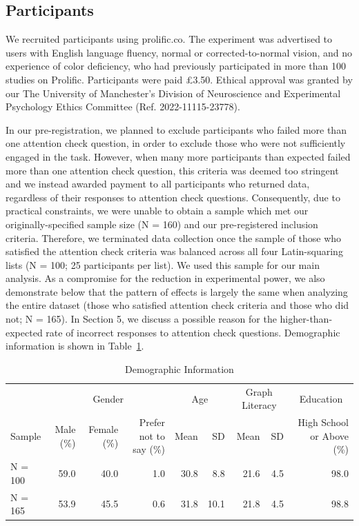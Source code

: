 \documentclass[
]{interact}
\begin{document}
\hypertarget{participants}{%
\subsection{Participants}\label{participants}}

We recruited participants using prolific.co. The experiment was
advertised to users with English language fluency, normal or
corrected-to-normal vision, and no experience of color deficiency, who
had previously participated in more than 100 studies on Prolific.
Participants were paid £3.50. Ethical approval was granted by our The
University of Manchester's Division of Neuroscience and Experimental
Psychology Ethics Committee (Ref. 2022-11115-23778).

In our pre-registration, we planned to exclude participants who failed
more than one attention check question, in order to exclude those who
were not sufficiently engaged in the task. However, when many more
participants than expected failed more than one attention check
question, this criteria was deemed too stringent and we instead awarded
payment to all participants who returned data, regardless of their
responses to attention check questions. Consequently, due to practical
constraints, we were unable to obtain a sample which met our
originally-specified sample size (N = 160) and our pre-registered
inclusion criteria. Therefore, we terminated data collection once the
sample of those who satisfied the attention check criteria was balanced
across all four Latin-squaring lists (N = 100; 25 participants per
list). We used this sample for our main analysis. As a compromise for
the reduction in experimental power, we also demonstrate below that the
pattern of effects is largely the same when analyzing the entire dataset
(those who satisfied attention check criteria and those who did not; N =
165). In Section 5, we discuss a possible reason for the
higher-than-expected rate of incorrect responses to attention check
questions. Demographic information is shown in
Table~\ref{tbl-demographics}.

\hypertarget{tbl-demographics}{}
\begin{table}
\caption{\label{tbl-demographics}Demographic Information }\tabularnewline

\centering\begingroup\fontsize{8}{10}\selectfont

\begin{tabular}{lrrrrrrrr}
\toprule
\multicolumn{1}{c}{ } & \multicolumn{3}{c}{Gender} & \multicolumn{2}{c}{Age} & \multicolumn{2}{c}{Graph Literacy} & \multicolumn{1}{c}{Education} \\
\cmidrule(l{3pt}r{3pt}){2-4} \cmidrule(l{3pt}r{3pt}){5-6} \cmidrule(l{3pt}r{3pt}){7-8} \cmidrule(l{3pt}r{3pt}){9-9}
Sample & Male (\%) & Female (\%) & Prefer not to say (\%) & Mean & SD & Mean & SD & High School
or Above (\%)\\
\midrule
N = 100 & 59.0 & 40.0 & 1.0 & 30.8 & 8.8 & 21.6 & 4.5 & 98.0\\
N = 165 & 53.9 & 45.5 & 0.6 & 31.8 & 10.1 & 21.8 & 4.5 & 98.8\\
\bottomrule
\end{tabular}
\endgroup{}
\end{table}
\end{document}
